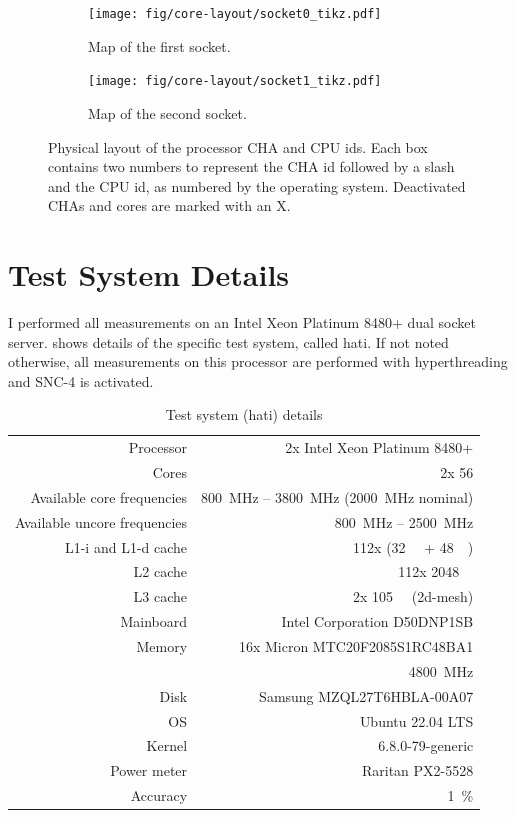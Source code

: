 \begin{figure}[]
    \begin{subfigure}[t]{0.45\linewidth}
        \centering
        \texttt{[image: fig/core-layout/socket0\_tikz.pdf]}
        \caption{Map of the first socket.}
    \end{subfigure}
    \hfill
    \begin{subfigure}[t]{0.45\linewidth}
        \centering
        \texttt{[image: fig/core-layout/socket1\_tikz.pdf]}
        \caption{Map of the second socket.}
    \end{subfigure}
    \caption{\label{fig:physical-layout}Physical layout of the processor CHA and CPU ids.
	Each box contains two numbers to represent the CHA id followed by a slash and the CPU id, as numbered by the operating system.
	Deactivated CHAs and cores are marked with an X.}
\end{figure}

\section{Test System Details}
I performed all measurements on an Intel Xeon Platinum 8480+ dual socket server.
 shows details of the specific test system, called hati.
If not noted otherwise, all measurements on this processor are performed with hyperthreading and SNC-4 is activated.

\begin{table}[t]
	\centering
	\caption{\label{tab:test-system}Test system (hati) details}
	\begin{tabular}{rr}
		\toprule
		Processor	&	2x Intel Xeon Platinum 8480+ \\
		\rowcolor[HTML]{EFEFEF}Cores		&	2x 56 \\
		Available core frequencies	&	\SI{800}{\MHz} -- \SI{3800}{\MHz} (\SI{2000}{\MHz} nominal) \\
		\rowcolor[HTML]{EFEFEF}Available uncore frequencies	&	\SI{800}{\MHz} -- \SI{2500}{\MHz} \\
		L1-i and L1-d cache	&	112x (\SI{32}{\kibi\byte} + \SI{48}{\kibi\byte})\\
		\rowcolor[HTML]{EFEFEF}L2 cache	&	112x \SI{2048}{\kibi\byte} \\
		L3 cache	&	2x \SI{105}{\mebi\byte} (2d-mesh) \\
		\rowcolor[HTML]{EFEFEF}Mainboard	&	Intel Corporation D50DNP1SB \\
		Memory		&	16x Micron MTC20F2085S1RC48BA1  \\
		 &	\SI{4800}{\mega\hertz} \\
		\rowcolor[HTML]{EFEFEF}Disk		&	Samsung MZQL27T6HBLA-00A07 \\
		OS           &   Ubuntu 22.04 LTS \\
		\rowcolor[HTML]{EFEFEF} Kernel          &   6.8.0-79-generic \\
		Power meter & Raritan PX2-5528\\
		\rowcolor[HTML]{EFEFEF} Accuracy & \SI{1}{\percent}\\
		\bottomrule
	\end{tabular}
\end{table}


